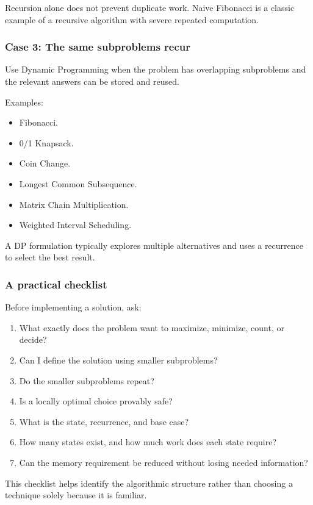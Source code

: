 Recursion alone does not prevent duplicate work. Naive Fibonacci is a classic example of a recursive algorithm with severe repeated computation.

\subsubsection{Case 3: The same subproblems recur}

Use Dynamic Programming when the problem has overlapping subproblems and the relevant answers can be stored and reused.

Examples:

\begin{itemize}
    \item Fibonacci.
    \item 0/1 Knapsack.
    \item Coin Change.
    \item Longest Common Subsequence.
    \item Matrix Chain Multiplication.
    \item Weighted Interval Scheduling.
\end{itemize}

A DP formulation typically explores multiple alternatives and uses a recurrence to select the best result.

\subsubsection{A practical checklist}

Before implementing a solution, ask:

\begin{enumerate}
    \item What exactly does the problem want to maximize, minimize, count, or decide?
    \item Can I define the solution using smaller subproblems?
    \item Do the smaller subproblems repeat?
    \item Is a locally optimal choice provably safe?
    \item What is the state, recurrence, and base case?
    \item How many states exist, and how much work does each state require?
    \item Can the memory requirement be reduced without losing needed information?
\end{enumerate}

This checklist helps identify the algorithmic structure rather than choosing a technique solely because it is familiar.


